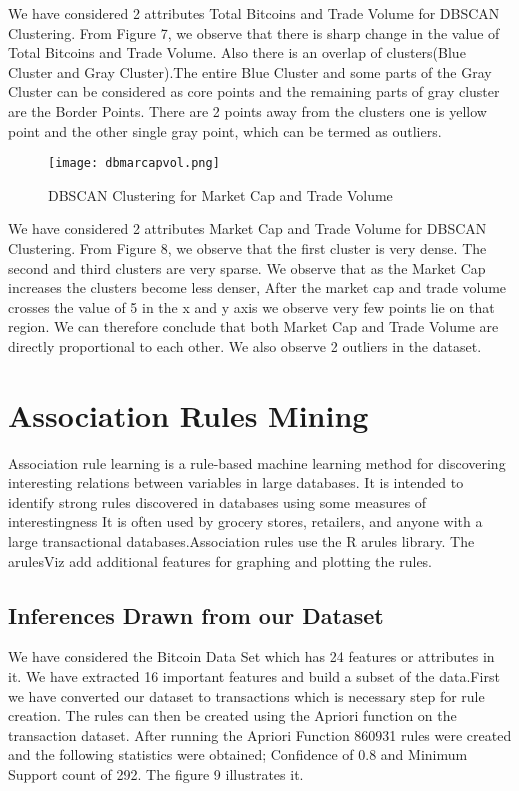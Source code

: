 \documentclass{article}
\begin{document}
We have considered 2 attributes Total Bitcoins and Trade Volume for DBSCAN Clustering. From Figure 7, we observe that there is sharp change in the value of Total Bitcoins and Trade Volume. Also there is an overlap of clusters(Blue Cluster and Gray Cluster).The entire Blue Cluster and some parts of the Gray Cluster can be considered as core points and the remaining parts of gray cluster are the Border Points. There are 2 points away from the clusters one is yellow point and the other single gray point, which can be termed as outliers. \newline

\begin{figure}[h]
    \centering
    \texttt{[image: dbmarcapvol.png]}
    \caption{DBSCAN Clustering for Market Cap and Trade Volume }
    \label{fig:my_label}
\end{figure}


We have considered 2 attributes Market Cap and Trade Volume for DBSCAN Clustering. From Figure 8, we observe that the first cluster is very dense. The second and third clusters are very sparse. We observe that as the Market Cap increases the clusters become less denser, After the market cap and trade volume crosses the value of 5 in the x and y axis we observe very few points lie on that region. We can therefore conclude that both Market Cap and Trade Volume are directly proportional to each other. We also observe 2 outliers in the dataset.

\section {Association Rules Mining}
Association rule learning is a rule-based machine learning method for discovering interesting relations between variables in large databases. It is intended to identify strong rules discovered in databases using some measures of interestingness It is often used by grocery stores, retailers, and anyone with a large transactional databases.Association rules use the R arules library. The arulesViz add additional features for graphing and plotting the rules. 

\subsection{Inferences Drawn from our Dataset}
We have considered the Bitcoin Data Set which has 24 features or attributes in it. We have extracted 16 important features and build a subset of the data.First we have converted our dataset to transactions which is necessary step for rule creation. The rules can then be created using the Apriori function on the transaction dataset. After running the Apriori Function 860931 rules were created and the following statistics were obtained; Confidence of 0.8 and Minimum Support count of 292. The figure 9 illustrates it. \newline
\end{document}
